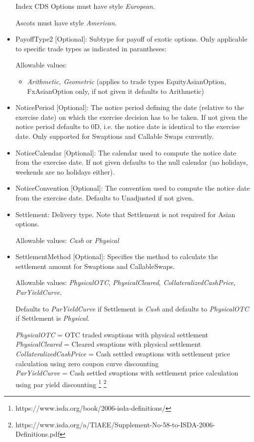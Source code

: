 \begin{itemize}
  Index CDS Options must have style  \emph{European}. 
  
  Ascots must have style  \emph{American}. 

\item PayoffType2 [Optional]: Subtype for payoff of exotic options. Only applicable to specific trade types as indicated in parantheses:

  Allowable values:
  \begin{itemize}
  \item \emph{Arithmetic, Geometric} (applies to trade types EquityAsianOption, FxAsianOption only, if not given it defaults to Arithmetic)
  \end{itemize}
  
\item NoticePeriod [Optional]: The notice period defining the date (relative to the exercise date) on which the exercise
  decision has to be taken. If not given the notice period defaults to 0D, i.e. the notice date is identical to the
  exercise date. Only supported for Swaptions and Callable Swaps currently.

\item NoticeCalendar [Optional]: The calendar used to compute the notice date from the exercise date. If not given
  defaults to the null calendar (no holidays, weekends are no holidays either).

\item NoticeConvention [Optional]: The convention used to compute the notice date from the exercise date. Defaults to
  Unadjusted if not given.

\item Settlement: Delivery type. Note that Settlement is not required for Asian options.

  Allowable values: \emph{Cash} or \emph{Physical}

\item SettlementMethod [Optional]: Specifies the method to calculate the settlement amount for Swaptions and CallableSwaps.

  Allowable values: \emph{PhysicalOTC}, \emph{PhysicalCleared}, \emph{CollateralizedCashPrice},\\ \emph{ParYieldCurve}. 
  
  Defaults to \emph{ParYieldCurve} if Settlement is \emph{Cash} and defaults to \emph{PhysicalOTC} if Settlement is \emph{Physical}.

\emph{PhysicalOTC} = OTC traded swaptions with physical settlement\\
\emph{PhysicalCleared} = Cleared swaptions with physical settlement\\
\emph{CollateralizedCashPrice} = Cash settled swaptions with settlement price calculation using zero coupon curve discounting \\
\emph{ParYieldCurve}  = Cash settled swaptions with settlement price calculation using par yield discounting \footnote{https://www.isda.org/book/2006-isda-definitions/} \footnote{https://www.isda.org/a/TlAEE/Supplement-No-58-to-ISDA-2006-Definitions.pdf} \\


\end{itemize}
